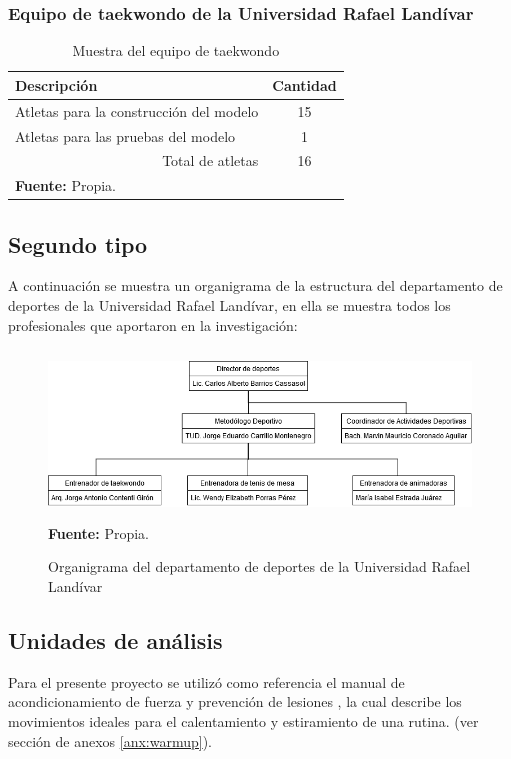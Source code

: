 \subsubsection{Equipo de taekwondo de la Universidad Rafael Land\'ivar}\label{sj:1t:tae}
\begin{table}[H]
\begin{center}
\caption{Muestra del equipo de taekwondo}
\label{tab:MuestraTaekwondo}
\begin{tabular}{lc}
\hline
\multicolumn{1}{|l|}{\textbf{Descripci\'on}} & \multicolumn{1}{l|}{\textbf{Cantidad}} \\ \hline
\multicolumn{1}{|l|}{Atletas para la construcci\'on del modelo} & \multicolumn{1}{c|}{15} \\ \hline
\multicolumn{1}{|l|}{Atletas para las pruebas del modelo} & \multicolumn{1}{c|}{1} \\ \hline
\multicolumn{1}{|r|}{Total de atletas} & \multicolumn{1}{c|}{16} \\ \hline
\textbf{Fuente:} Propia.
\end{tabular}
\end{center}
\end{table}
\subsection{Segundo tipo} \label{sj:2t}
A continuaci\'on se muestra un organigrama de la estructura del departamento de deportes de la Universidad Rafael Land\'ivar, en ella se muestra todos los profesionales que aportaron en la investigaci\'on:
\begin{figure}[H]
	\caption{Organigrama del departamento de deportes de la Universidad Rafael Land\'ivar}
	\label{fig:orgDeportes}
	\centering
	\includegraphics[width=450px,height=170px]{graphics/orgDeportes.png} \\
	\textbf{Fuente:} Propia.
\end{figure}
\subsection{Unidades de an\'alisis} \label{sj:ua}
Para el presente proyecto se utiliz\'o como referencia el manual de acondicionamiento de fuerza y prevenci\'on de lesiones  \cite{arbour2006strength}, la cual describe los movimientos ideales para el calentamiento  y estiramiento de una rutina. (ver secci\'on de anexos \ref{anx:warmup}).